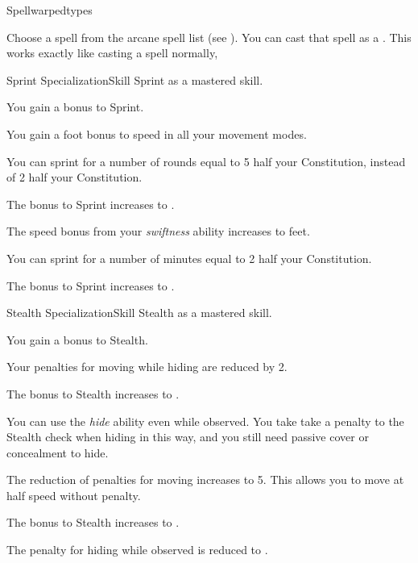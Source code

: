     \begin{feat}{Spellwarped}{types}
        \featben

         Choose a spell from the arcane spell list (see ).
        You can cast that spell as a .
        This works exactly like casting a spell normally,

    \end{feat}

    \begin{feat}{Sprint Specialization}{Skill}
        \featpre Sprint as a mastered skill.
        \featben

         You gain a  bonus to Sprint.

         You gain a  foot bonus to speed in all your movement modes.

         You can sprint for a number of rounds equal to 5 \add half your Constitution, instead of 2 \add half your Constitution.

         The bonus to Sprint increases to .

         The speed bonus from your \textit{swiftness} ability increases to  feet.

         You can sprint for a number of minutes equal to 2 \add half your Constitution.

         The bonus to Sprint increases to .
    \end{feat}

    \begin{feat}{Stealth Specialization}{Skill}
        \featpre Stealth as a mastered skill.
        \featben

         You gain a  bonus to Stealth.

        \ff[2]{}

         Your penalties for moving while hiding are reduced by 2. 

         The bonus to Stealth increases to .

         You can use the \textit{hide} ability even while observed.
        You take take a  penalty to the Stealth check when hiding in this way, and you still need passive cover or concealment to hide.

         The reduction of penalties for moving increases to 5.
        This allows you to move at half speed without penalty.

         The bonus to Stealth increases to .

         The penalty for hiding while observed is reduced to .
    \end{feat}

